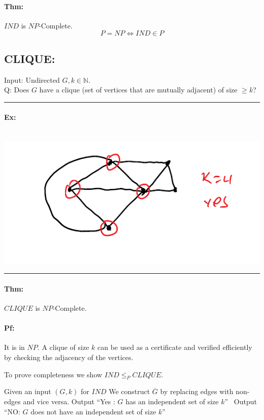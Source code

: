 \documentclass[12 pt]{article}
\begin{document}
          \paragraph{Thm:} $IND$ is $NP$-Complete.
          $$P=NP \iff IND \in P$$
          \subsection{CLIQUE:}
          Input: Undirected $G, k \in \mathbb{N}$.
          \\ Q: Does $G$ have a clique (set of vertices that are
          mutually adjacent) of size $\geq k$?
          \\ \noindent \rule{\textwidth}{0.5pt}
          \paragraph{Ex:}~
          \\ \includegraphics[width=.9\textwidth]{i130.pdf}
          \\ \noindent \rule{\textwidth}{0.5pt}
          \paragraph{Thm:} $CLIQUE$ is $NP$-Complete.
          \paragraph{Pf:} It is in $NP$. A clique of size $k$ can be
          used as a certificate and verified efficiently by checking
          the adjacency of the vertices.

          To prove completeness we show $IND \leq_P CLIQUE$.
          \begin{algorithmic}
            \State Given an input $(G,k)$ for $IND$
            \State We construct $\overline{G}$ by replacing edges with
            non-edges and vice versa.
             Output ``Yes
            : $G$ has an independent set of size $k$''
            \Else \ Output ``NO: $G$ does not have an independent set of
            size $k$''
            \EndIf
          \end{algorithmic}
\end{document}
